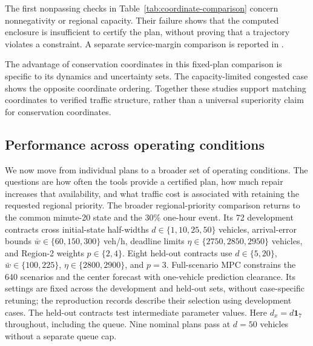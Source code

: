 The first nonpassing checks in Table~\ref{tab:coordinate-comparison}
concern nonnegativity or regional capacity. Their failure shows that the
computed enclosure is insufficient to certify the plan, without proving
that a trajectory violates a constraint. A separate service-margin
comparison is reported in .

The advantage of conservation coordinates in this fixed-plan comparison
is specific to its dynamics and uncertainty sets. The capacity-limited
congested case shows the opposite coordinate ordering. Together these
studies support matching coordinates to verified traffic structure,
rather than a universal superiority claim for conservation coordinates.

\subsection{Performance across operating conditions}

\label{sec:uncertainty-results}

We now move from individual plans to a broader set of operating
conditions. The questions are how often the tools provide a certified
plan, how much repair increases that availability, and what traffic cost
is associated with retaining the requested regional priority.
The broader regional-priority comparison returns to the common minute-20 state and
the 30\% one-hour event. Its 72 development contracts cross initial-state
half-widths $d\in\{1,10,25,50\}$ vehicles, arrival-error bounds
$\bar w\in\{60,150,300\}$ veh/h, deadline limits
$\eta\in\{2750,2850,2950\}$ vehicles, and Region-2 weights $p\in\{2,4\}$.
Eight held-out contracts use $d\in\{5,20\}$,
$\bar w\in\{100,225\}$, $\eta\in\{2800,2900\}$, and $p=3$.
Full-scenario MPC constrains the 640 scenarios and the center forecast
with one-vehicle prediction clearance. Its settings are fixed across the development and held-out sets,
without case-specific retuning; the reproduction records describe their
selection using development cases. The held-out contracts test intermediate parameter values.
Here $d_x=d\mathbf1_7$ throughout, including the queue. Nine nominal
plans pass at $d=50$ vehicles without a separate queue cap.

